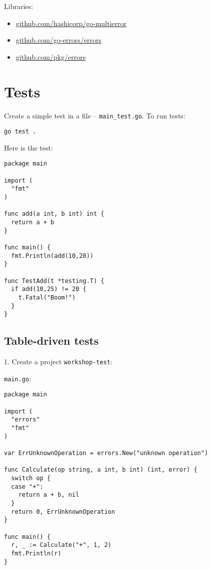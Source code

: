 \documentclass[11pt, letterpaper]{article}
\begin{document}
\bigskip

Libraries:

\begin{itemize}
\item \href{https://github.com/hashicorp/go-multierror}{github.com/hashicorp/go-multierror}
\item \href{https://github.com/go-errors/errors}{github.com/go-errors/errors}
\item \href{https://github.com/pkg/errors}{github.com/pkg/errors}
\end{itemize}

\pagebreak
\section{Tests}

Create a simple test in a file -- \texttt{main_test.go}. To run tests: 
\begin{verbatim}
go test .
\end{verbatim}

Here is the test:

\begin{verbatim}
package main

import (
  "fmt"
)

func add(a int, b int) int {
  return a + b
}

func main() {
  fmt.Println(add(10,20))
}

func TestAdd(t *testing.T) {
  if add(10,25) != 20 {
    t.Fatal("Boom!")
  }
}
\end{verbatim}

\pagebreak
\subsection{Table-driven tests}

1. Create a project \verb|workshop-test|:

\verb|main.go|:

\begin{verbatim}
package main

import (
  "errors"
  "fmt"
)

var ErrUnknownOperation = errors.New("unknown operation")

func Calculate(op string, a int, b int) (int, error) {
  switch op {
  case "+":
    return a + b, nil
  }
  return 0, ErrUnknownOperation
}

func main() {
  r, _ := Calculate("+", 1, 2)
  fmt.Println(r)
}
\end{verbatim}
\end{document}
